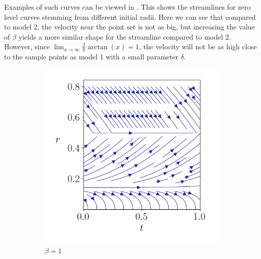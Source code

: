 Examples of such curves can be viewed in . This shows the streamlines for zero level curves stemming from different initial radii. Here we can see that compared to model 2, the velocity near the point set is not as big, but increasing the value of $\beta$ yields a more similar shape for the streamline compared to model 2. However, since $\lim_{x\to\infty}\frac{2}{\pi} \arctan (x)=1$, the velocity will not be as high close to the sample points as model 1 with a small parameter $\delta$. 

\begin{figure}
    \begin{subfigure}{.5\linewidth}
        \centering
        \includegraphics[width=\linewidth]{figures/streamlines/mod3-a90.png}
        \caption{$\beta=1$}
        \label{fig:arctan-sub1}
    \end{subfigure}%
    \begin{subfigure}{.5\linewidth}
        \centering

\end{subfigure}
\end{figure}
